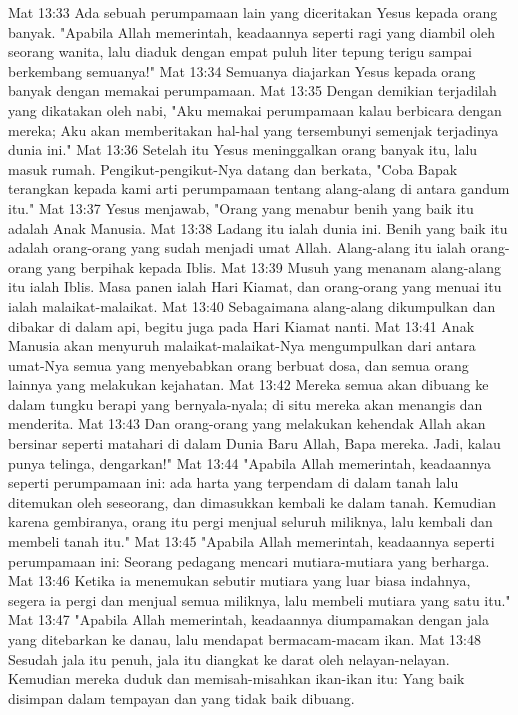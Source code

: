 Mat 13:33  Ada sebuah perumpamaan lain yang diceritakan Yesus kepada orang banyak. "Apabila Allah memerintah, keadaannya seperti ragi yang diambil oleh seorang wanita, lalu diaduk dengan empat puluh liter tepung terigu sampai berkembang semuanya!"
Mat 13:34  Semuanya diajarkan Yesus kepada orang banyak dengan memakai perumpamaan.
Mat 13:35  Dengan demikian terjadilah yang dikatakan oleh nabi, "Aku memakai perumpamaan kalau berbicara dengan mereka; Aku akan memberitakan hal-hal yang tersembunyi semenjak terjadinya dunia ini."
Mat 13:36  Setelah itu Yesus meninggalkan orang banyak itu, lalu masuk rumah. Pengikut-pengikut-Nya datang dan berkata, "Coba Bapak terangkan kepada kami arti perumpamaan tentang alang-alang di antara gandum itu."
Mat 13:37  Yesus menjawab, "Orang yang menabur benih yang baik itu adalah Anak Manusia.
Mat 13:38  Ladang itu ialah dunia ini. Benih yang baik itu adalah orang-orang yang sudah menjadi umat Allah. Alang-alang itu ialah orang-orang yang berpihak kepada Iblis.
Mat 13:39  Musuh yang menanam alang-alang itu ialah Iblis. Masa panen ialah Hari Kiamat, dan orang-orang yang menuai itu ialah malaikat-malaikat.
Mat 13:40  Sebagaimana alang-alang dikumpulkan dan dibakar di dalam api, begitu juga pada Hari Kiamat nanti.
Mat 13:41  Anak Manusia akan menyuruh malaikat-malaikat-Nya mengumpulkan dari antara umat-Nya semua yang menyebabkan orang berbuat dosa, dan semua orang lainnya yang melakukan kejahatan.
Mat 13:42  Mereka semua akan dibuang ke dalam tungku berapi yang bernyala-nyala; di situ mereka akan menangis dan menderita.
Mat 13:43  Dan orang-orang yang melakukan kehendak Allah akan bersinar seperti matahari di dalam Dunia Baru Allah, Bapa mereka. Jadi, kalau punya telinga, dengarkan!"
Mat 13:44  "Apabila Allah memerintah, keadaannya seperti perumpamaan ini: ada harta yang terpendam di dalam tanah lalu ditemukan oleh seseorang, dan dimasukkan kembali ke dalam tanah. Kemudian karena gembiranya, orang itu pergi menjual seluruh miliknya, lalu kembali dan membeli tanah itu."
Mat 13:45  "Apabila Allah memerintah, keadaannya seperti perumpamaan ini: Seorang pedagang mencari mutiara-mutiara yang berharga.
Mat 13:46  Ketika ia menemukan sebutir mutiara yang luar biasa indahnya, segera ia pergi dan menjual semua miliknya, lalu membeli mutiara yang satu itu."
Mat 13:47  "Apabila Allah memerintah, keadaannya diumpamakan dengan jala yang ditebarkan ke danau, lalu mendapat bermacam-macam ikan.
Mat 13:48  Sesudah jala itu penuh, jala itu diangkat ke darat oleh nelayan-nelayan. Kemudian mereka duduk dan memisah-misahkan ikan-ikan itu: Yang baik disimpan dalam tempayan dan yang tidak baik dibuang.
